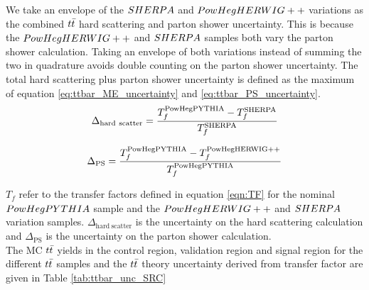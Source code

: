 \indent We take an envelope of the $SHERPA$ and $PowHegHERWIG++$ variations as the combined $t\bar{t}$ hard scattering and parton shower uncertainty.  This is because the $PowHegHERWIG++$ and $SHERPA$ samples both vary the parton shower calculation.  Taking an envelope of both variations instead of summing the two in quadrature avoids double counting on the parton shower uncertainty. The total hard scattering plus parton shower uncertainty is defined as the maximum of equation \ref{eq:ttbar_ME_uncertainty} and \ref{eq:ttbar_PS_uncertainty}.  \\

    \begin{eqnarray}
      \Delta_{\mathrm{hard~scatter}} = \frac{T_f^{\mathrm{PowHegPYTHIA}} - T_f^{\mathrm{SHERPA}}}{T_f^{\mathrm{SHERPA}}}
      \label{eq:ttbar_ME_uncertainty}
    \end{eqnarray}

    \begin{eqnarray}
      \Delta_{\mathrm{PS}} = \frac{T_f^{\mathrm{PowHegPYTHIA}} - T_f^{\mathrm{PowHegHERWIG++}}}{T_f^{\mathrm{PowHegPYTHIA}}}
      \label{eq:ttbar_PS_uncertainty}
    \end{eqnarray}

\indent $T_f$ refer to the transfer factors defined in equation \ref{eqn:TF} for the nominal $PowHegPYTHIA$ sample and the $PowHegHERWIG++$ and $SHERPA$ variation samples.  $\Delta_{\mathrm{hard~scatter}}$ is the uncertainty on the hard scattering calculation and $\Delta_{\mathrm{PS}}$ is the uncertainty on the parton shower calculation. \\

\indent The MC $t\bar{t}$ yields in the control region, validation region and signal region for the different $t\bar{t}$ samples and the $t\bar{t}$ theory uncertainty derived from transfer factor are given in Table \ref{tab:ttbar_unc_SRC}  \\
  
